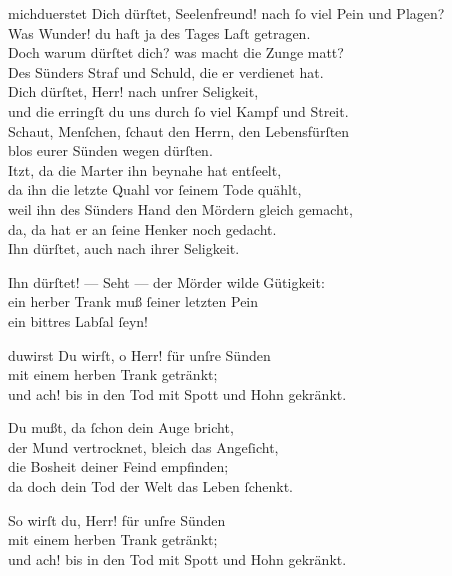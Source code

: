 \documentclass[shorttitlesize=50,tocstyle=ref-genre]{ees}
\begin{document}
{\begin{movement}{michduerstet}
    \voice[Johannes]
    Dich dürſtet, Seelenfreund! nach ſo viel Pein und Plagen?\\
    Was Wunder! du haſt ja des Tages Laſt getragen.\\
    Doch warum dürſtet dich? was macht die Zunge matt?\\
    Des Sünders Straf und Schuld, die er verdienet hat.\\
    Dich dürſtet, Herr! nach unſrer Seligkeit,\\
    und die erringſt du uns durch ſo viel Kampf und Streit.\\
    Schaut, Menſchen, ſchaut den Herrn, den Lebensfürſten\\
    blos eurer Sünden wegen dürſten.\\
    Itzt, da die Marter ihn beynahe hat entſeelt,\\
    da ihn die letzte Quahl vor ſeinem Tode quählt,\\
    weil ihn des Sünders Hand den Mördern gleich gemacht,\\
    da, da hat er an ſeine Henker noch gedacht.\\
    Ihn dürſtet, auch nach ihrer Seligkeit.

    \voice[Maria]
    Ihn dürſtet! — Seht — der Mörder wilde Gütigkeit:\\
    ein herber Trank muß ſeiner letzten Pein\\
    ein bittres Labſal ſeyn!
  \end{movement}

  \begin{movement}{duwirst}
    Du wirſt, o Herr! für unſre Sünden\\
    mit einem herben Trank getränkt;\\
    und ach! bis in den Tod mit Spott und Hohn gekränkt.

    Du mußt, da ſchon dein Auge bricht,\\
    der Mund vertrocknet, bleich das Angeſicht,\\
    die Bosheit deiner Feind empfinden;\\
    da doch dein Tod der Welt das Leben ſchenkt.

    So wirſt du, Herr! für unſre Sünden\\
    mit einem herben Trank getränkt;\\
    und ach! bis in den Tod mit Spott und Hohn gekränkt.
  \end{movement}
}

\eesScore
\end{document}
